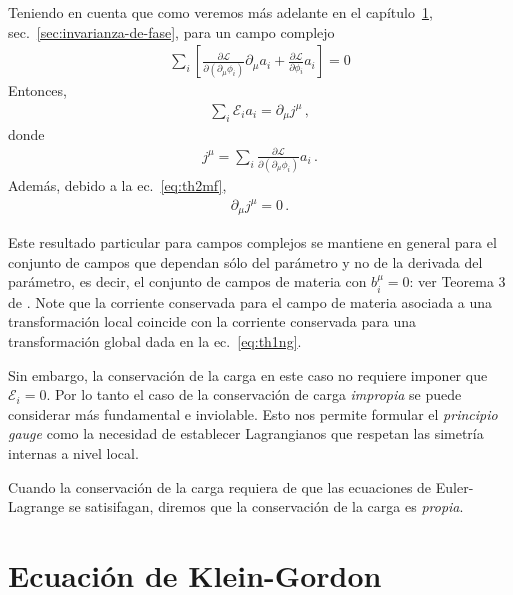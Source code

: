 \begin{frame}
Teniendo en cuenta que como veremos más adelante en el capítulo~\ref{}, sec.~\ref{sec:invarianza-de-fase}, para un campo complejo
\begin{align}
  \label{eq:identityth2}
\sum_i \left[\frac{\partial\mathcal{L}}{\partial(\partial_{\mu}\phi_i)}\partial_{\mu}a_i+\frac{\partial\mathcal{L}}{\partial\phi_i}a_i \right]=0
\end{align}
Entonces, 
\begin{align}
\sum_i \mathcal{E}_ia_i=\partial_{\mu} j^{\mu}\,,
\end{align}
donde
\begin{align}
\label{eq:tnoeth2}
j^\mu=\sum_i\frac{\partial\mathcal{L}}{\partial(\partial_{\mu}\phi_i)}a_{i}\,.
\end{align}
Además, debido a la ec.~\eqref{eq:th2mf},
\begin{align}
  \partial_{\mu} j^{\mu}=0\,.
\end{align}


Este resultado particular para campos complejos se mantiene en general para el conjunto de campos que dependan sólo del parámetro y no de la derivada del parámetro, es decir, el conjunto de campos de materia con $b_i^\mu=0$: ver Teorema 3 de \cite{Brading:2000hc}. Note que la corriente conservada para el campo de materia asociada a una transformación local coincide con la corriente conservada para una transformación global dada en la ec.~\eqref{eq:th1ng}.


Sin embargo, la conservación de la carga en este caso no requiere imponer que $\mathcal{E}_i=0$. Por lo tanto el caso de la conservación de carga \emph{impropia} se puede considerar más fundamental e inviolable. Esto nos permite formular el \emph{principio gauge} como la necesidad de establecer Lagrangianos que respetan las simetría internas a nivel local.
\end{frame}


Cuando la conservación de la carga requiera de que las ecuaciones de Euler-Lagrange se satisifagan, diremos que la conservación de la carga es \emph{propia}.

\section{Ecuación de Klein-Gordon}


